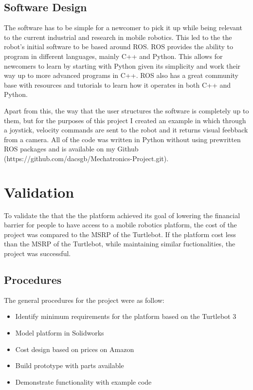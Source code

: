 \documentclass[12pt, letterpaper,titlepage]{article}
\begin{document}
\subsection{Software Design}

	The software has to be simple for a newcomer to pick it up while being relevant to the current industrial and research in mobile robotics. This led to the the robot's initial software to be based around ROS. ROS provides the ability to program in different languages, mainly C++ and Python. This allows for newcomers to learn by starting with Python given its simplicity and work their way up to more advanced programs in C++. ROS also has a great community base with resources and tutorials to learn how it operates in both C++ and Python. 

	Apart from this, the way that the user structures the software is completely up to them, but for the purposes of this project I created an example in which through a joystick, velocity commands are sent to the robot and it returns visual feebback from a camera. All of the code was written in Python without using prewritten ROS packages and is available on my Github (https://github.com/dacsgb/Mechatronics-Project.git).

\section{Validation}
	To validate the that the the platform achieved its goal of lowering the financial barrier for people to have access to a mobile robotics platform, the cost of the project was compared to the MSRP of the Turtlebot. If the platform cost less than the MSRP of the Turtlebot, while maintaining similar fuctionalities, the project was successful.

\subsection{Procedures}

	The general procedures for the project were as follow:

	\begin{itemize}
		\item Identify minimum requirements for the platform based on the Turtlebot 3
		\item Model platform in Solidworks
		\item Cost design based on prices on Amazon
		\item Build prototype with parts available
		\item Demonstrate functionality with example code
	\end{itemize}
\end{document}
